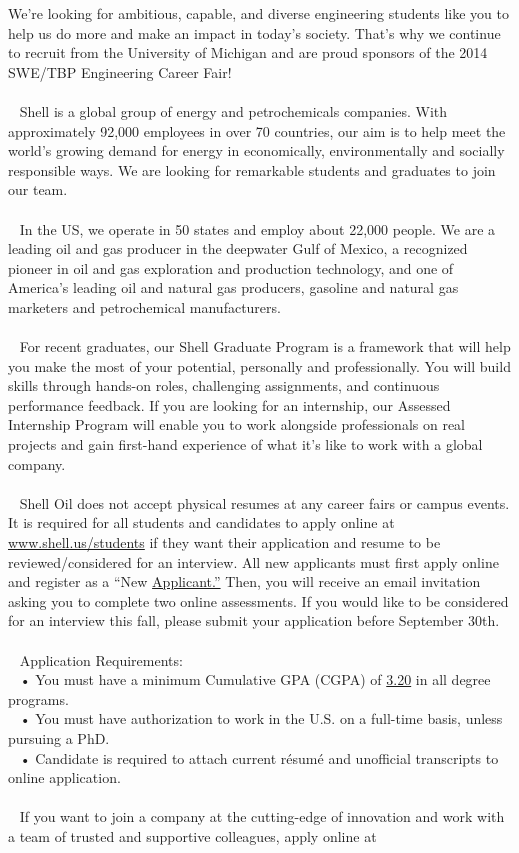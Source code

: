 \documentclass[twoside]{article}
\begin{document}
\begin{multicols}{2}
We’re looking for ambitious, capable, and diverse engineering students like you to help us do more and make an impact in today’s society. That’s why we continue to recruit from the University of Michigan and are proud sponsors of the 2014 SWE/TBP Engineering Career Fair! \\[-0.800000ex]~ \\[-0.800000ex]~ Shell is a global group of energy and petrochemicals companies. With approximately 92,000 employees in over 70 countries, our aim is to help meet the world’s growing demand for energy in economically, environmentally and socially responsible ways. We are looking for remarkable students and graduates to join our team. \\[-0.800000ex]~ \\[-0.800000ex]~ In the US, we operate in 50 states and employ about 22,000 people. We are a leading oil and gas producer in the deepwater Gulf of Mexico, a recognized pioneer in oil and gas exploration and production technology, and one of America’s leading oil and natural gas producers, gasoline and natural gas marketers and petrochemical manufacturers. \\[-0.800000ex]~ \\[-0.800000ex]~ For recent graduates, our Shell Graduate Program is a framework that will help you make the most of your potential, personally and professionally. You will build skills through hands-on roles, challenging assignments, and continuous performance feedback. If you are looking for an internship, our Assessed Internship Program will enable you to work alongside professionals on real projects and gain first-hand experience of what it’s like to work with a global company. \\[-0.800000ex]~ \\[-0.800000ex]~ Shell Oil does not accept physical resumes at any career fairs or campus events. It is required for all students and candidates to apply online at \url{www.shell.us/students} if they want their application and resume to be reviewed/considered for an interview. All new applicants must first apply online and register as a “New \url{Applicant.”} Then, you will receive an email invitation asking you to complete two online assessments. If you would like to be considered for an interview this fall, please submit your application before September 30th. \\[-0.800000ex]~ \\[-0.800000ex]~ Application Requirements: \\[-0.800000ex]~ • You must have a minimum Cumulative GPA (CGPA) of \url{3.20} in all degree programs. \\[-0.800000ex]~ • You must have authorization to work in the U.S. on a full-time basis, unless pursuing a PhD. \\[-0.800000ex]~ • Candidate is required to attach current résumé and unofficial transcripts to online application. \\[-0.800000ex]~ \\[-0.800000ex]~ If you want to join a company at the cutting-edge of innovation and work with a team of trusted and supportive colleagues, apply online at 
\end{multicols}
\end{document}
